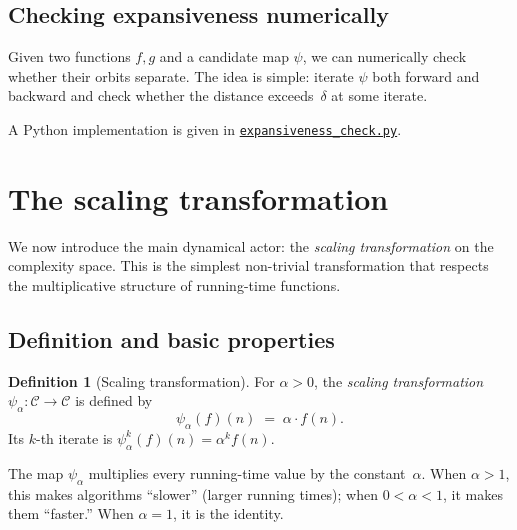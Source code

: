 \documentclass[11pt,a4paper]{article}
\newcommand{\repourl}{https://github.com/guydev42/expansive-homeomorphisms-complexity-qmetric}
\theoremstyle{plain}
\theoremstyle{definition}
\newtheorem{definitioninner}[theoreminner]{Definition}
\newenvironment{definition}[1][]{\begin{definitioninner}[#1]}{\end{definitioninner}}
\newcommand{\C}{\mathcal{C}}
\begin{document}
\subsection{Checking expansiveness numerically}

Given two functions $f,g$ and a candidate map $\psi$, we can
numerically check whether their orbits separate.  The idea is simple:
iterate $\psi$ both forward and backward and check whether the
distance exceeds~$\delta$ at some iterate.

\begin{algorithm}[H]
\DontPrintSemicolon
\SetAlgoLined
{}
\;
\caption{Check expansive separation}
\label{alg:check-exp}
\end{algorithm}

A Python implementation is given in
\href{\repourl/blob/main/code/python/expansiveness_check.py}{\texttt{expansiveness\_check.py}}.


\section{The scaling transformation}
\label{sec:scaling}

We now introduce the main dynamical actor: the \emph{scaling
transformation} on the complexity space.  This is the simplest
non-trivial transformation that respects the multiplicative structure
of running-time functions.

\subsection{Definition and basic properties}

\begin{definition}[Scaling transformation]\label{def:scaling}
For $\alpha>0$, the \emph{scaling transformation}
$\psi_\alpha\colon\C\to\C$ is defined by
\[
  \psi_\alpha(f)(n) \;=\; \alpha\cdot f(n).
\]
Its $k$-th iterate is $\psi_\alpha^k(f)(n)=\alpha^k f(n)$.
\end{definition}

The map $\psi_\alpha$ multiplies every running-time value by the
constant~$\alpha$.  When $\alpha>1$, this makes algorithms
``slower'' (larger running times); when $0<\alpha<1$, it makes them
``faster.''  When $\alpha=1$, it is the identity.
\end{document}
